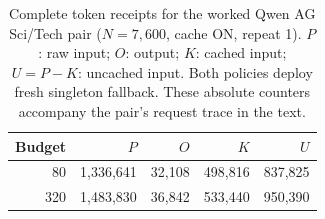 \begin{table}[t]
\centering\small
\caption{Complete token receipts for the worked Qwen AG Sci/Tech pair ($N=7,600$, cache ON, repeat 1). $P$: raw input; $O$: output; $K$: cached input; $U=P-K$: uncached input. Both policies deploy fresh singleton fallback. These absolute counters accompany the pair's request trace in the text.}
\label{tab:budget_worked_pair}
\begin{tabular}{rrrrr}
\toprule
Budget & $P$ & $O$ & $K$ & $U$ \\
\midrule
80 & 1,336,641 & 32,108 & 498,816 & 837,825 \\
320 & 1,483,830 & 36,842 & 533,440 & 950,390 \\
\bottomrule
\end{tabular}
\end{table}
